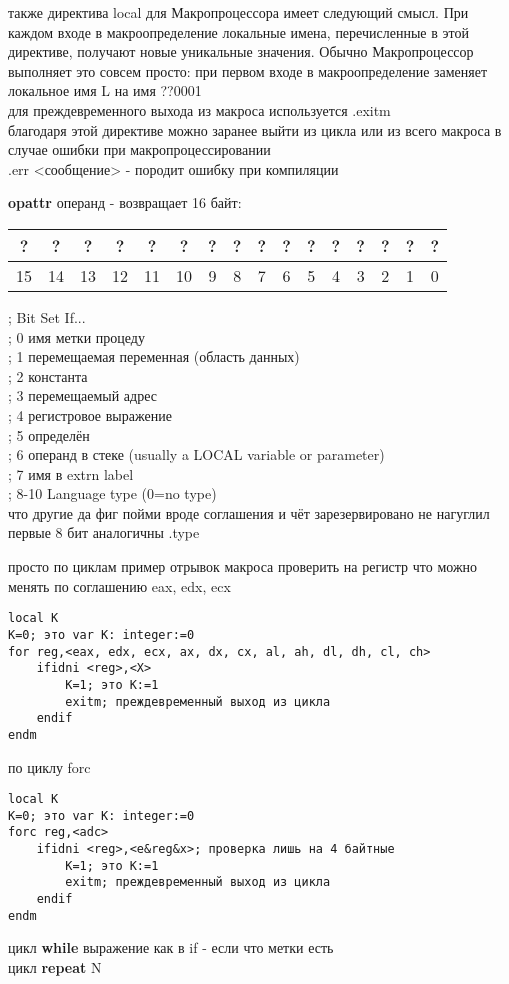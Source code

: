 \documentclass[a4paper,10pt]{article}
\begin{document}
также директива local для Макропроцессора имеет следующий смысл. При каждом входе в макроопределение локальные имена, перечисленные в этой директиве, получают новые уникальные значения. Обычно Макропроцессор выполняет это совсем просто:
при первом входе в макроопределение заменяет локальное имя L на имя ??0001 \\
для преждевременного выхода из макроса используется .exitm \\
благодаря этой директиве можно заранее выйти из цикла или из всего макроса в случае ошибки при макропроцессировании \\
.err <сообщение> - породит ошибку при компиляции \par
\noindent
\textbf{opattr} операнд - возвращает 16 байт: \\
\begin{tabular}{|c|c|c|c|c|c|c|c|c|c|c|c|c|c|c|c|}
    \hline
    ? & ? & ? & ? & ? & ? & ? & ? & ? & ? & ? & ? & ? & ? & ? & ?  \\
    \hline
    15 & 14 & 13 & 12 & 11 & 10 & 9 & 8 & 7 & 6 & 5 & 4 & 3 & 2 & 1 & 0 \\
    \hline
\end{tabular}
\newpage
\noindent
;     Bit    Set If... \\
;     0      имя метки процеду \\ 
;     1      перемещаемая переменная (область данных)\\
;     2      константа \\
;     3      перемещаемый адрес \\
;     4      регистровое выражение \\
;     5      определён \\ 
;     6      операнд в стеке (usually a LOCAL variable or parameter) \\
;     7      имя в extrn label \\
;     8-10   Language type (0=no type) \\
что другие да фиг пойми вроде соглашения и чёт зарезервировано не нагуглил\\
первые 8 бит аналогичны .type \par
просто по циклам пример отрывок макроса проверить на регистр что можно менять по соглашению eax, edx, ecx  \\
\begin{verbatim}
local K
K=0; это var K: integer:=0
for reg,<eax, edx, ecx, ax, dx, cx, al, ah, dl, dh, cl, ch>
    ifidni <reg>,<X>
        K=1; это K:=1
        exitm; преждевременный выход из цикла
    endif
endm
\end{verbatim}
по циклу forc
\begin{verbatim}
local K
K=0; это var K: integer:=0
forc reg,<adc>
    ifidni <reg>,<e&reg&x>; проверка лишь на 4 байтные
        K=1; это K:=1
        exitm; преждевременный выход из цикла
    endif
endm
\end{verbatim}
цикл \textbf{while} выражение как в if - если что метки есть\\
цикл \textbf{repeat} N \\
\end{document}
